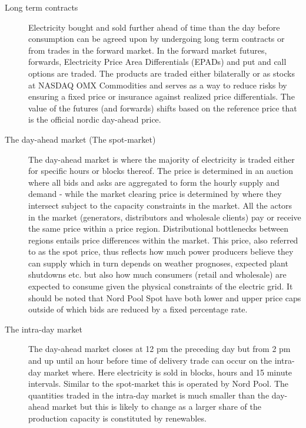 \begin{description}

    \item [Long term contracts]
    Electricity bought and sold further ahead of time than the day before consumption can be agreed upon by undergoing long term contracts or from trades in the forward market. In the forward market futures, forwards, Electricity Price Area Differentials (EPADs) and put and call options are traded. The products are traded either bilaterally or as stocks at NASDAQ OMX Commodities and serves as a way to reduce risks by ensuring a fixed price or insurance against realized price differentials. The value of the futures (and forwards) shifts based on the reference price that is the official nordic day-ahead price.

    \item [The day-ahead market (The spot-market)]
    The day-ahead market is where the majority of electricity is traded either for specific hours or blocks thereof. The price is determined in an auction where all bids and asks are aggregated to form the hourly supply and demand - while the market clearing price is determined by where they intersect subject to the capacity constraints in the market. All the actors in the market (generators, distributors and wholesale clients) pay or receive the same price within a price region. Distributional bottlenecks between regions entails price differences within the market. This price, also referred to as the spot price, thus reflects how much power producers believe they can supply which in turn depends on weather prognoses, expected plant shutdowns etc. but also how much consumers (retail and wholesale) are expected to consume given the physical constraints of the electric grid. It should be noted that Nord Pool Spot have both lower and upper price caps outside of which bids are reduced by a fixed percentage rate.

    \item [The intra-day market]
     The day-ahead market closes at 12 pm the preceding day but from 2 pm and up until an hour before time of delivery trade can occur on the intra-day market where. Here electricity is sold in blocks, hours and 15 minute intervals. Similar to the spot-market this is operated by Nord Pool. The quantities traded in the intra-day market is much smaller than the day-ahead market but this is likely to change as a larger share of the production capacity is constituted by renewables. %


\end{description}
